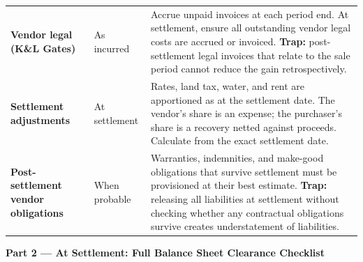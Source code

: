 \documentclass[10pt,a4paper]{article}
\begin{document}
{\begin{longtable}{@{} L{3.2cm} L{1.8cm} L{7.7cm} @{}}
\textbf{Vendor legal (K\&L Gates)} & As incurred & Accrue unpaid invoices at each period end. At settlement, ensure all outstanding vendor legal costs are accrued or invoiced. \textbf{Trap:} post-settlement legal invoices that relate to the sale period cannot reduce the gain retrospectively. \\
\textbf{Settlement adjustments} & At settlement & Rates, land tax, water, and rent are apportioned as at the settlement date. The vendor's share is an expense; the purchaser's share is a recovery netted against proceeds. Calculate from the exact settlement date. \\
\textbf{Post-settlement vendor obligations} & When probable & Warranties, indemnities, and make-good obligations that survive settlement must be provisioned at their best estimate. \textbf{Trap:} releasing all liabilities at settlement without checking whether any contractual obligations survive creates understatement of liabilities. \\
\bottomrule
\end{longtable}}

\textbf{Part 2 --- At Settlement: Full Balance Sheet Clearance Checklist}
\end{document}
